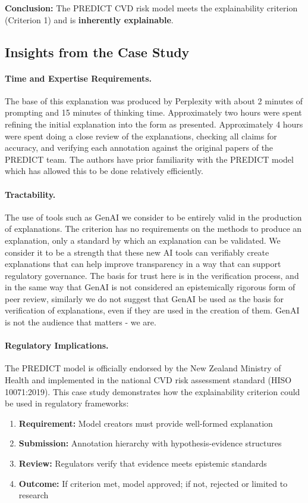 \documentclass{article}
\begin{document}
\textbf{Conclusion:} The PREDICT CVD risk model meets the explainability criterion (Criterion 1) and is \textbf{inherently explainable}.

\subsection{Insights from the Case Study}

\paragraph{Time and Expertise Requirements.} The base of this explanation was produced by Perplexity with about 2 minutes of prompting and 15 minutes of thinking time. Approximately two hours were spent refining the initial explanation into the form as presented. Approximately 4 hours were spent doing a close review of the explanations, checking all claims for accuracy, and verifying each annotation against the original papers of the PREDICT team. The authors have prior familiarity with the PREDICT model which has allowed this to be done relatively efficiently.

\paragraph{Tractability.} The use of tools such as GenAI we consider to be entirely valid in the production of explanations. The criterion has no requirements on the methods to produce an explanation, only a standard by which an explanation can be validated. We consider it to be a strength that these new AI tools can verifiably create explanations that can help improve transparency in a way that can support regulatory governance. The basis for trust here is in the verification process, and in the same way that GenAI is not considered an epistemically rigorous form of peer review, similarly we do not suggest that GenAI be used as the basis for verification of explanations, even if they are used in the creation of them. GenAI is not the audience that matters - we are.

\paragraph{Regulatory Implications.}

The PREDICT model is officially endorsed by the New Zealand Ministry of Health and implemented in the national CVD risk assessment standard (HISO 10071:2019). This case study demonstrates how the explainability criterion could be used in regulatory frameworks:
\begin{enumerate}
    \item \textbf{Requirement:} Model creators must provide well-formed explanation
    \item \textbf{Submission:} Annotation hierarchy with hypothesis-evidence structures
    \item \textbf{Review:} Regulators verify that evidence meets epistemic standards
    \item \textbf{Outcome:} If criterion met, model approved; if not, rejected or limited to research
\end{enumerate}
\end{document}
